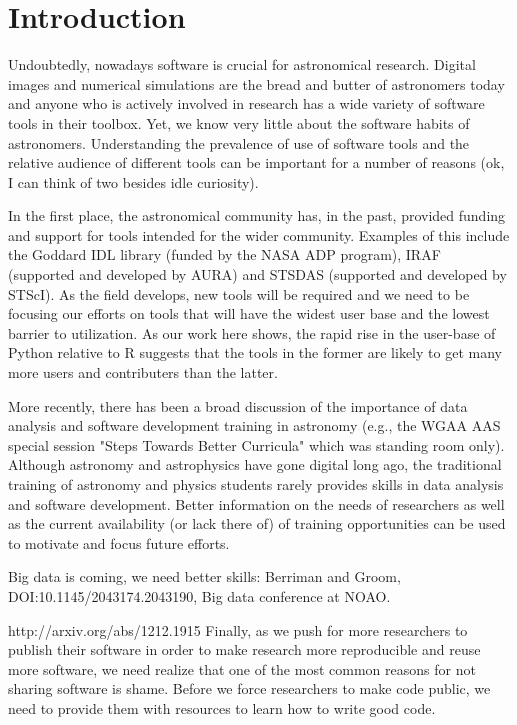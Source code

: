 \section{Introduction}

Undoubtedly, nowadays software is crucial for astronomical research. Digital images and numerical simulations are the bread and butter of astronomers today and anyone who is actively involved in research has a wide variety of software tools in their toolbox. Yet, we know very little about the software habits of astronomers. Understanding the prevalence of use of software tools and the relative audience of different tools can be important for a number of reasons (ok, I can think of two besides idle curiosity).

In the first place, the astronomical community has, in the past, provided funding and support for tools intended for the wider community. Examples of this include the Goddard IDL library (funded by the NASA ADP program), IRAF (supported and developed by AURA) and STSDAS (supported and developed by STScI). As the field develops, new tools will be required and we need to be focusing our efforts on tools that will have the widest user base and the lowest barrier to utilization. As our work here shows, the rapid rise in the user-base of Python relative to R suggests that the tools in the former are likely to get many more users and contributers than the latter. 

More recently, there has been a broad discussion of the importance of data analysis and software development training in astronomy (e.g., the WGAA AAS special session "Steps Towards Better Curricula" which was standing room only). Although astronomy and astrophysics have gone digital long ago, the traditional training of astronomy and physics students rarely provides skills in data analysis and software development. Better information on the needs of researchers as well as the current availability (or lack there of) of training opportunities can be used to motivate and focus future efforts. 

Big data is coming, we need better skills: Berriman and Groom, DOI:10.1145/2043174.2043190, Big data conference at NOAO.

http://arxiv.org/abs/1212.1915
Finally, as we push for more researchers to publish their software in order to make research more reproducible and reuse more software, we need realize that one of the most common reasons for not sharing software is shame. Before we force researchers to make code public, we need to provide them with resources to learn how to write good code. 

